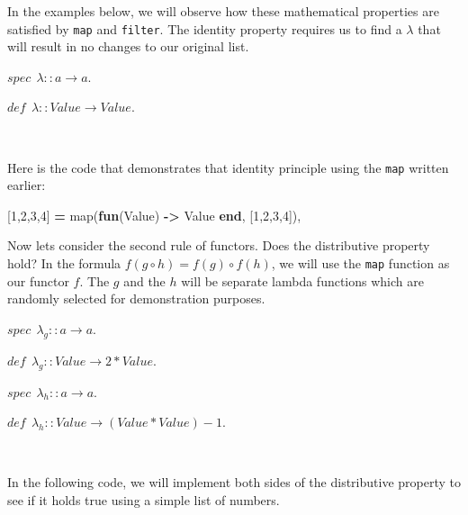 \documentclass[
]{book}
\newenvironment{Shaded}{\begin{snugshade}}{\end{snugshade}}
\newcommand{\DecValTok}[1]{\textcolor[rgb]{0.00,0.00,0.81}{#1}}
\newcommand{\FunctionTok}[1]{\textcolor[rgb]{0.00,0.00,0.00}{#1}}
\newcommand{\KeywordTok}[1]{\textcolor[rgb]{0.13,0.29,0.53}{\textbf{#1}}}
\newcommand{\OperatorTok}[1]{\textcolor[rgb]{0.81,0.36,0.00}{\textbf{#1}}}
\newcommand{\VariableTok}[1]{\textcolor[rgb]{0.00,0.00,0.00}{#1}}
\begin{document}
In the examples below, we will observe how these mathematical properties are satisfied by \texttt{map} and \texttt{filter}. The identity property requires us to find a \(\lambda\) that will result in no changes to our original list.

\begin{formulabox}
\(spec ~ ~ \lambda :: a \rightarrow a.\)

\(de\mathit{f} ~ ~ \lambda :: Value \rightarrow Value.\)

\end{formulabox}

\(\nonumber\)

Here is the code that demonstrates that identity principle using the \texttt{map} written earlier:

\begin{Shaded}
\begin{Highlighting}[]
\FunctionTok{[}\DecValTok{1}\FunctionTok{,}\DecValTok{2}\FunctionTok{,}\DecValTok{3}\FunctionTok{,}\DecValTok{4}\FunctionTok{]} \OperatorTok{=} \FunctionTok{map(}\KeywordTok{fun}\FunctionTok{(}\VariableTok{Value}\FunctionTok{)} \OperatorTok{{-}\textgreater{}} \VariableTok{Value} \KeywordTok{end}\FunctionTok{,} \FunctionTok{[}\DecValTok{1}\FunctionTok{,}\DecValTok{2}\FunctionTok{,}\DecValTok{3}\FunctionTok{,}\DecValTok{4}\FunctionTok{]),}
\end{Highlighting}
\end{Shaded}

Now lets consider the second rule of functors. Does the distributive property hold? In the formula \(f(g \circ h) = f(g) \circ f(h)\), we will use the \texttt{map} function as our functor \(f\). The \(g\) and the \(h\) will be separate lambda functions which are randomly selected for demonstration purposes.

\begin{formulabox}
\(spec ~ ~ \lambda_g :: a \rightarrow a.\)

\(de\mathit{f} ~ ~ \lambda_g :: Value \rightarrow 2 * Value.\)

\(spec ~ ~ \lambda_h:: a \rightarrow a.\)

\(de\mathit{f} ~ ~ \lambda_h :: Value \rightarrow (Value*Value) - 1.\)

\end{formulabox}

\(\nonumber\)

In the following code, we will implement both sides of the distributive property to see if it holds true using a simple list of numbers.
\end{document}
